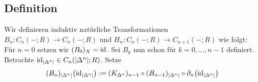 \subsection{Definition} %
\label{sub:139}
Wir definieren induktiv natürliche Transformationen $B_n \colon C_n(-;R) \to C_n(-;R)$ und $H_n \colon C_n(-;R) \to C_{n+1}(-;R)$ wie folgt: Für $n=0$ setzen wir
$(B_0)_X = \operatorname{id}$. Sei $B_k$ nun schon für $k=0, \ldots ,n-1$ definiert. Betrachte $\id_{\abs*{\Delta^n}} \in C_n \enbrace*{\abs*{\Delta^n};R}$. Setze 
\[
	(B_n)_{\abs*{\Delta^n}} \enbrace*{\id_{\abs*{\Delta^n}}} :=  (K_{\Delta^n})_{n-1} \circ (B_{n-1})_{\abs*{\Delta^n}}\circ \partial_n \enbrace*{\id_{\abs*{\Delta^n}}} 
\]
\cleardoubleoddemptypage
{}
\setcounter{page}{1}
\printindex
\listoffigures
\todototoc
{}
